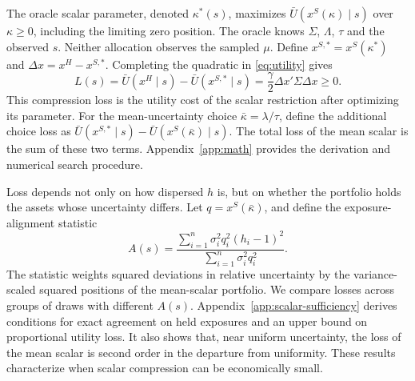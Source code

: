 The oracle scalar parameter, denoted $\kappa^*(s)$, maximizes $\bar U(x^S(\kappa)\mid s)$ over $\kappa\geq0$, including the limiting zero position. The oracle knows $\Sigma$, $\Lambda$, $\tau$ and the observed $s$. Neither allocation observes the sampled $\mu$. Define $x^{S,*}=x^S(\kappa^*)$ and $\Delta x=x^H-x^{S,*}$. Completing the quadratic in \eqref{eq:utility} gives
\begin{equation}
L(s)=\bar U(x^H\mid s)-\bar U(x^{S,*}\mid s)
=\frac{\gamma}{2}\Delta x'\Sigma\Delta x\geq0.
\label{eq:loss}
\end{equation}
This compression loss is the utility cost of the scalar restriction after optimizing its parameter. For the mean-uncertainty choice $\bar\kappa=\lambda/\tau$, define the additional choice loss as $\bar U(x^{S,*}\mid s)-\bar U(x^S(\bar\kappa)\mid s)$. The total loss of the mean scalar is the sum of these two terms. Appendix~\ref{app:math} provides the derivation and numerical search procedure.

Loss depends not only on how dispersed $h$ is, but on whether the portfolio holds the assets whose uncertainty differs. Let $q=x^S(\bar\kappa)$, and define the exposure-alignment statistic
\begin{equation}
A(s)=\frac{\sum_{i=1}^n\sigma_i^2q_i^2(h_i-1)^2}
{\sum_{i=1}^n\sigma_i^2q_i^2}.
\label{eq:alignment}
\end{equation}
The statistic weights squared deviations in relative uncertainty by the variance-scaled squared positions of the mean-scalar portfolio. We compare losses across groups of draws with different $A(s)$. Appendix~\ref{app:scalar-sufficiency} derives conditions for exact agreement on held exposures and an upper bound on proportional utility loss. It also shows that, near uniform uncertainty, the loss of the mean scalar is second order in the departure from uniformity. These results characterize when scalar compression can be economically small.

